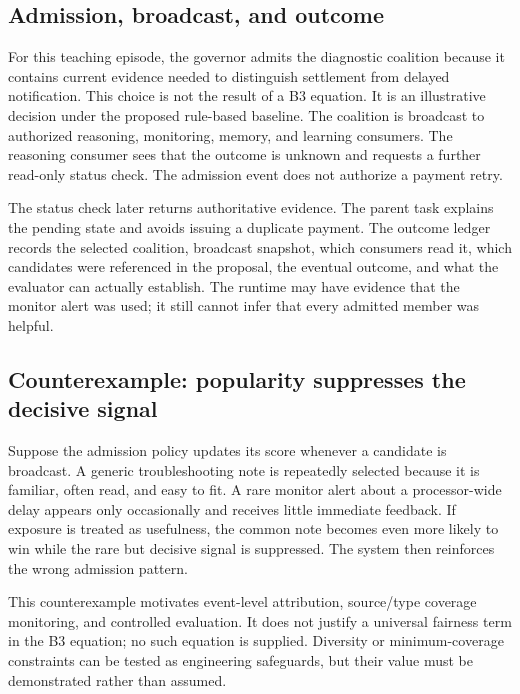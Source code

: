 \subsection{Admission, broadcast, and outcome}

For this teaching episode, the governor admits the diagnostic coalition because it contains current evidence needed to distinguish settlement from delayed notification. This choice is not the result of a B3 equation. It is an illustrative decision under the proposed rule-based baseline. The coalition is broadcast to authorized reasoning, monitoring, memory, and learning consumers. The reasoning consumer sees that the outcome is unknown and requests a further read-only status check. The admission event does not authorize a payment retry.

The status check later returns authoritative evidence. The parent task explains the pending state and avoids issuing a duplicate payment. The outcome ledger records the selected coalition, broadcast snapshot, which consumers read it, which candidates were referenced in the proposal, the eventual outcome, and what the evaluator can actually establish. The runtime may have evidence that the monitor alert was used; it still cannot infer that every admitted member was helpful.


\subsection{Counterexample: popularity suppresses the decisive signal}

Suppose the admission policy updates its score whenever a candidate is broadcast. A generic troubleshooting note is repeatedly selected because it is familiar, often read, and easy to fit. A rare monitor alert about a processor-wide delay appears only occasionally and receives little immediate feedback. If exposure is treated as usefulness, the common note becomes even more likely to win while the rare but decisive signal is suppressed. The system then reinforces the wrong admission pattern.

This counterexample motivates event-level attribution, source/type coverage monitoring, and controlled evaluation. It does not justify a universal fairness term in the B3 equation; no such equation is supplied. Diversity or minimum-coverage constraints can be tested as engineering safeguards, but their value must be demonstrated rather than assumed.


